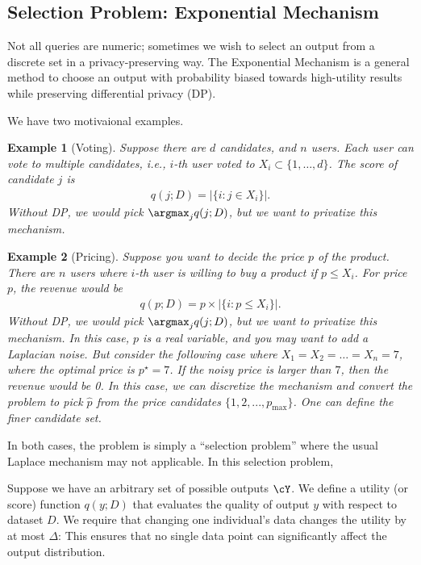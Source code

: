 \documentclass[11pt, a4paper]{article}
\newtheorem{example}{Example}
\begin{document}
\subsection{Selection Problem: Exponential Mechanism}
Not all queries are numeric; sometimes we wish to select an output from a discrete set in a privacy-preserving way.
The Exponential Mechanism \cite{DworkRoth2014} is a general method to choose an output with probability biased 
towards high-utility results while preserving differential privacy (DP).

We have two motivaional examples.
\begin{example}[Voting]
    Suppose there are $d$ candidates, and $n$ users.
    Each user can vote to multiple candidates, i.e., $i$-th user voted to $X_i\subset\{1, \dots, d\}$.
    The score of candidate $j$ is
    \begin{align}
        q(j;D) = |\{i:j\in X_i\}|.
    \end{align}
    Without DP, we would pick $\argmax_j q(j;D)$, but we want to privatize this mechanism.
\end{example}
\begin{example}[Pricing]
    Suppose you want to decide the price $p$ of the product.
    There are $n$ users where $i$-th user is willing to buy a product if $p\leq X_i$.
    For price $p$, the revenue would be
    \begin{align}
        q(p;D) = p \times  | \{i: p\leq X_i\}|.
    \end{align}
    Without DP, we would pick $\argmax_j q(j;D)$, but we want to privatize this mechanism.
    In this case, $p$ is a real variable, and you may want to add a Laplacian noise.
    But consider the following case where $X_1=X_2=\dots = X_n = 7$, where the optimal price is $p^\star = 7$.
    If the noisy price is larger than $7$, then the revenue would be 0.
    In this case, we can discretize the mechanism and convert the problem to pick $\hat{p}$ from the price candidates
    $\{1, 2, ..., p_{\max}\}$.
    One can define the finer candidate set.
\end{example}
In both cases, the problem is simply a ``selection problem'' where the usual Laplace mechanism may not applicable.
In this selection problem, 

Suppose we have an arbitrary set of possible outputs $\cY$.
We define a utility (or score) function $q(y; D)$ that evaluates the quality of output $y$ with respect to dataset $D$.
We require that changing one individual's data changes the utility by at most $\Delta$:
This ensures that no single data point can significantly affect the output distribution.
\end{document}

